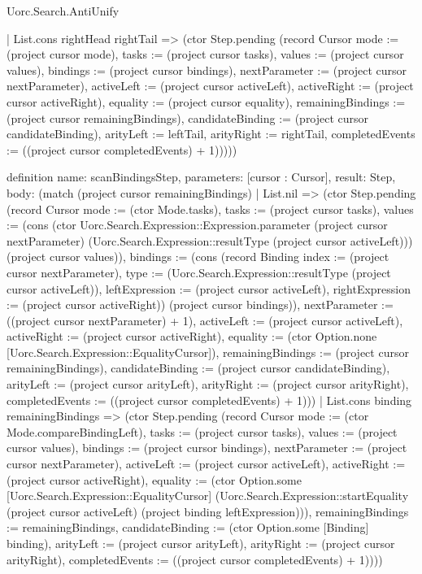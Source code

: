 \begin{lexlean}{Uorc.Search.AntiUnify}
\begin{semanticmodule}
{      | List.cons rightHead rightTail => (ctor Step.pending (record Cursor {mode := (project cursor mode), tasks := (project cursor tasks), values := (project cursor values), bindings := (project cursor bindings), nextParameter := (project cursor nextParameter), activeLeft := (project cursor activeLeft), activeRight := (project cursor activeRight), equality := (project cursor equality), remainingBindings := (project cursor remainingBindings), candidateBinding := (project cursor candidateBinding), arityLeft := leftTail, arityRight := rightTail, completedEvents := ((project cursor completedEvents) + 1)}))))
}

definition{
  name: scanBindingsStep,
  parameters: [cursor : Cursor],
  result: Step,
  body: (match (project cursor remainingBindings)
    | List.nil => (ctor Step.pending (record Cursor {mode := (ctor Mode.tasks), tasks := (project cursor tasks), values := (cons (ctor Uorc.Search.Expression::Expression.parameter (project cursor nextParameter) (Uorc.Search.Expression::resultType (project cursor activeLeft))) (project cursor values)), bindings := (cons (record Binding {index := (project cursor nextParameter), type := (Uorc.Search.Expression::resultType (project cursor activeLeft)), leftExpression := (project cursor activeLeft), rightExpression := (project cursor activeRight)}) (project cursor bindings)), nextParameter := ((project cursor nextParameter) + 1), activeLeft := (project cursor activeLeft), activeRight := (project cursor activeRight), equality := (ctor Option.none [Uorc.Search.Expression::EqualityCursor]), remainingBindings := (project cursor remainingBindings), candidateBinding := (project cursor candidateBinding), arityLeft := (project cursor arityLeft), arityRight := (project cursor arityRight), completedEvents := ((project cursor completedEvents) + 1)}))
    | List.cons binding remainingBindings => (ctor Step.pending (record Cursor {mode := (ctor Mode.compareBindingLeft), tasks := (project cursor tasks), values := (project cursor values), bindings := (project cursor bindings), nextParameter := (project cursor nextParameter), activeLeft := (project cursor activeLeft), activeRight := (project cursor activeRight), equality := (ctor Option.some [Uorc.Search.Expression::EqualityCursor] (Uorc.Search.Expression::startEquality (project cursor activeLeft) (project binding leftExpression))), remainingBindings := remainingBindings, candidateBinding := (ctor Option.some [Binding] binding), arityLeft := (project cursor arityLeft), arityRight := (project cursor arityRight), completedEvents := ((project cursor completedEvents) + 1)})))
}


\end{semanticmodule}
\end{lexlean}
